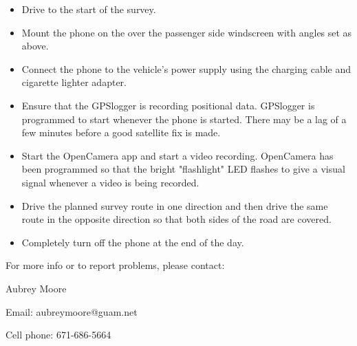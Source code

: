 \documentclass[12pt,letterpaper,english,bibliography=totocnumbered, abstract=on]{scrartcl}
\begin{document}
\begin{itemize}
	\item Drive to the start of the survey.
	\item Mount the phone on the over the passenger side windscreen with angles set as above.
	\item Connect the phone to the vehicle's power supply using the charging cable and cigarette lighter adapter. 
	\item Ensure that the GPSlogger is recording positional data. GPSlogger is programmed to start whenever the phone is started. There may be a lag of a few minutes before a good satellite fix is made.
	\item Start the OpenCamera app and start a video recording. OpenCamera has been programmed so that the bright "flashlight" LED flashes to give a visual signal whenever a video is being recorded.
	\item Drive the planned survey route in one direction and then drive the same route in the opposite direction so that both sides of the road are covered.
	\item Completely turn off the phone at the end of the day.  
\end{itemize}

For more info or to report problems, please contact:

Aubrey Moore

Email: aubreymoore@guam.net

Cell phone: 671-686-5664

 
\end{document}
